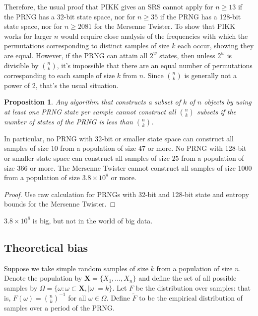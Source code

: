 \documentclass[12pt]{article}
\newtheorem{proposition}[theorem]{Proposition}
\newcommand{\todo}[1]{{\color{red}{TO DO: \sc #1}}}
\begin{document}
Therefore, the usual proof that PIKK gives an SRS cannot apply for $n \ge 13$ if the PRNG has a 32-bit state space, nor for $n \ge 35$ if the PRNG has a 128-bit state space, nor for $n \ge 2081$ for the Mersenne Twister.
To show that PIKK works for larger $n$ would require close analysis of the frequencies with which the permutations corresponding to distinct samples of size $k$ each occur, showing they are equal.
However, if the PRNG can attain all $2^w$ states, then unless $2^w$ is divisible by ${n \choose k}$, it's impossible that there are an equal number of permutations corresponding to each sample of size $k$ from $n$. Since ${n \choose k }$ is generally not a power of 2, that's the usual situation.



\begin{proposition}
Any algorithm that constructs a subset of $k$ of $n$ objects by using at least one PRNG state per sample cannot construct all $n \choose k$ subsets if the number of states of the PRNG is less than $n \choose k$.
\end{proposition}

In particular, no PRNG with 32-bit or smaller state space can construct all samples of size $10$ from a population of size $47$ or more. 
No PRNG with 128-bit or smaller state space can construct all samples of size $25$ from a population of size $366$ or more. 
The Mersenne Twister cannot construct all samples of size 1000 from a population of size $3.8 \times 10^8$ or more.

\begin{proof}
Use raw calculation for PRNGs with 32-bit and 128-bit state and entropy bounds for the Mersenne Twister.
\todo{flesh out}
\end{proof}

$3.8 \times 10^8$ is big, but not in the world of big data.

\subsection{Theoretical bias}

Suppose we take simple random samples of size $k$ from a population of size $n$.
Denote the population by $\mathbf{X} = \{X_1, \dots, X_n\}$ and define the set of all possible samples by
$\Omega = \{\omega : \omega \subset \mathbf{X}, \lvert \omega \rvert = k \}$.
Let $F$ be the distribution over samples: that is, $F(\omega) = {n \choose k}^{-1}$ for all $\omega \in \Omega$.
Define $\tilde{F}$ to be the empirical distribution of samples over a period of the PRNG.
\end{document}

